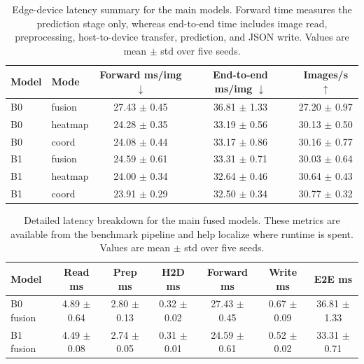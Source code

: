 \documentclass[10pt,letterpaper,twocolumn]{article}
\begin{document}
\begin{table}[H]
\centering
\footnotesize
\caption{Edge-device latency summary for the main models. Forward time measures the prediction stage only, whereas end-to-end time includes image read, preprocessing, host-to-device transfer, prediction, and JSON write. Values are mean $\pm$ std over five seeds.}
\label{tab:latency}
\begin{tabular}{llccc}
\toprule
Model & Mode & Forward ms/img $\downarrow$ & End-to-end ms/img $\downarrow$ & Images/s $\uparrow$ \\
\midrule
B0 & fusion & 27.43 $\pm$ 0.45 & 36.81 $\pm$ 1.33 & 27.20 $\pm$ 0.97 \\
B0 & heatmap & 24.28 $\pm$ 0.35 & 33.19 $\pm$ 0.56 & 30.13 $\pm$ 0.50 \\
B0 & coord & 24.08 $\pm$ 0.44 & 33.17 $\pm$ 0.86 & 30.16 $\pm$ 0.77 \\
B1 & fusion & 24.59 $\pm$ 0.61 & 33.31 $\pm$ 0.71 & 30.03 $\pm$ 0.64 \\
B1 & heatmap & 24.00 $\pm$ 0.34 & 32.64 $\pm$ 0.46 & 30.64 $\pm$ 0.43 \\
B1 & coord & 23.91 $\pm$ 0.29 & 32.50 $\pm$ 0.34 & 30.77 $\pm$ 0.32 \\
\bottomrule
\end{tabular}
\end{table}

\begin{table}[H]
\centering
\footnotesize
\caption{Detailed latency breakdown for the main fused models. These metrics are available from the benchmark pipeline and help localize where runtime is spent. Values are mean $\pm$ std over five seeds.}
\label{tab:latency_breakdown}
\begin{tabular}{lcccccc}
\toprule
Model & Read ms & Prep ms & H2D ms & Forward ms & Write ms & E2E ms \\
\midrule
B0 fusion & 4.89 $\pm$ 0.64 & 2.80 $\pm$ 0.13 & 0.32 $\pm$ 0.02 & 27.43 $\pm$ 0.45 & 0.67 $\pm$ 0.09 & 36.81 $\pm$ 1.33 \\
B1 fusion & 4.49 $\pm$ 0.08 & 2.74 $\pm$ 0.05 & 0.31 $\pm$ 0.01 & 24.59 $\pm$ 0.61 & 0.52 $\pm$ 0.02 & 33.31 $\pm$ 0.71 \\
\bottomrule
\end{tabular}
\end{table}
\end{document}
